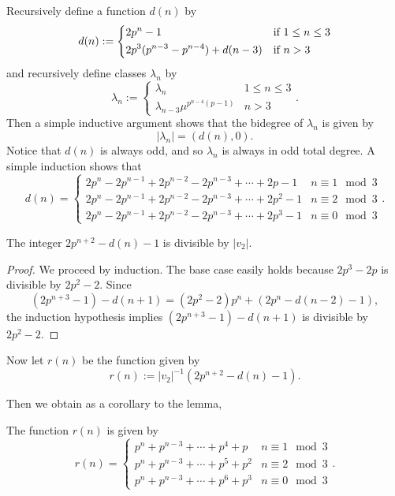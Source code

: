 Recursively define a function $d(n)$ by 
\[
d(n):= 
\begin{dcases*}
	2p^n-1 & if $1\leq n \leq 3$\\
	2p^3(p^{n-3}-p^{n-4}) + d(n-3) & if  $n>3$ 
\end{dcases*}
\]
and recursively define classes $\lambda_n$ by 
\[
\lambda_n:= \begin{cases}
	\lambda_n & 1\leq n \leq 3\\
	\lambda_{n-3}\mu^{p^{n-4}(p-1)} & n>3
\end{cases}.
\]
Then a simple inductive argument shows that the bidegree of $\lambda_n$ is given by
\begin{equation}
	|\lambda_n| = (d(n),0). 
\end{equation}
Notice that $d(n)$ is always odd, and so $\lambda_n$ is always in odd total degree. A simple induction shows that 
\[
d(n)=
\begin{cases}
	2p^n-2p^{n-1}+2p^{n-2}-2p^{n-3}+\cdots + 2p-1 & n\equiv 1 \mod 3\\
	2p^n-2p^{n-1}+2p^{n-2}-2p^{n-3}+\cdots + 2p^2-1 & n\equiv 2 \mod 3\\
	2p^n-2p^{n-1}+2p^{n-2}-2p^{n-3}+\cdots + 2p^3-1 & n\equiv 0 \mod 3
\end{cases}.
\]

\begin{lem}\label{lem:v2divisibility}
	The integer $2p^{n+2}-d(n)-1$ is divisible by $|v_2|$.
\end{lem}
\begin{proof}
	We proceed by induction. The base case easily holds because $2p^3-2p$ is divisible by $2p^2-2$. Since
	\[
	(2p^{n+3}-1)-d(n+1) = (2p^2-2)p^n + (2p^{n}-d(n-2)-1),
	\]
	the induction hypothesis implies $(2p^{n+3}-1)-d(n+1)$ is divisible by $2p^2-2$. 
\end{proof}


Now let $r(n)$ be the function given by 
\[
r(n):= |v_2|^{-1}(2p^{n+2}-d(n)-1).
\]

Then we obtain as a corollary to the lemma, 
\begin{cor}
The function $r(n)$ is given by 
\[
r(n) = \begin{cases}
	p^n+p^{n-3}+ \cdots +p^4+p & n\equiv 1 \mod 3\\
	p^n+p^{n-3}+ \cdots + p^5+p^2 & n\equiv 2 \mod 3\\
	p^n+p^{n-3}+ \cdots +p^6+ p^3 & n\equiv 0 \mod 3
\end{cases}.
\]	
\end{cor}

